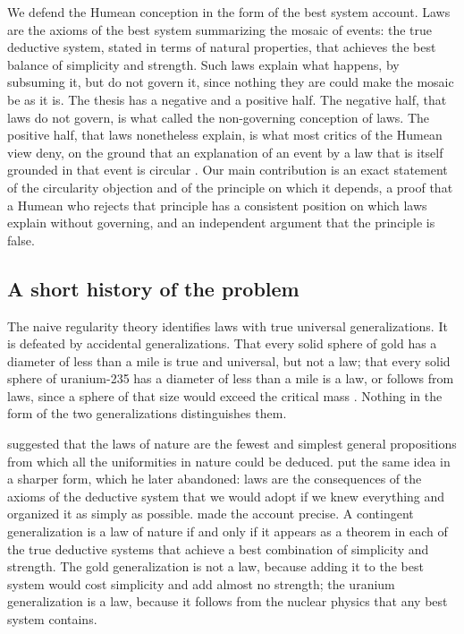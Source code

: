 \documentclass{situationist-preprint}
\begin{document}
We defend the Humean conception in the form of the best system account. Laws are the axioms of the best system summarizing the mosaic of events: the true deductive system, stated in terms of natural properties, that achieves the best balance of simplicity and strength. Such laws explain what happens, by subsuming it, but do not govern it, since nothing they are could make the mosaic be as it is. The thesis has a negative and a positive half. The negative half, that laws do not govern, is what \citet{Beebee2000} called the non-governing conception of laws. The positive half, that laws nonetheless explain, is what most critics of the Humean view deny, on the ground that an explanation of an event by a law that is itself grounded in that event is circular \citep{Armstrong1983,Maudlin2007,Lange2013}. Our main contribution is an exact statement of the circularity objection and of the principle on which it depends, a proof that a Humean who rejects that principle has a consistent position on which laws explain without governing, and an independent argument that the principle is false.

\subsection{A short history of the problem}\label{s:history}

The naive regularity theory identifies laws with true universal generalizations. It is defeated by accidental generalizations. That every solid sphere of gold has a diameter of less than a mile is true and universal, but not a law; that every solid sphere of uranium-235 has a diameter of less than a mile is a law, or follows from laws, since a sphere of that size would exceed the critical mass \citep{vanFraassen1989}. Nothing in the form of the two generalizations distinguishes them.

\citet[III.iv.1]{Mill1843} suggested that the laws of nature are the fewest and simplest general propositions from which all the uniformities in nature could be deduced. \citet{Ramsey1928} put the same idea in a sharper form, which he later abandoned: laws are the consequences of the axioms of the deductive system that we would adopt if we knew everything and organized it as simply as possible. \citet[ch.~3]{Lewis1973Counterfactuals} made the account precise. A contingent generalization is a law of nature if and only if it appears as a theorem in each of the true deductive systems that achieve a best combination of simplicity and strength. The gold generalization is not a law, because adding it to the best system would cost simplicity and add almost no strength; the uranium generalization is a law, because it follows from the nuclear physics that any best system contains.
\end{document}
